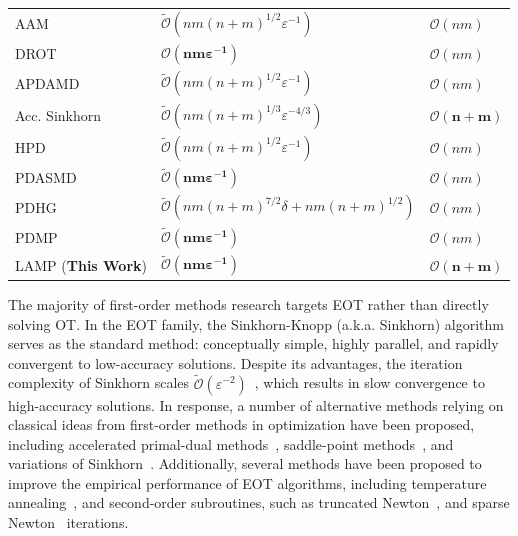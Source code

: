 \documentclass[10pt]{article}
\renewcommand{\O}{\mathcal{O}}
\newcommand{\tO}{\widetilde{\O}}
\theoremstyle{plain}
\theoremstyle{definition}
\theoremstyle{remark}
\begin{document}
\begin{table}[h]
\begin{tabular}{|l|l|l|}
           
         AAM~\cite{guminovCombinationAlternatingMinimization2021} & $\tO(nm(n+m)^{1/2}\varepsilon^{-1})$  & $\mathcal{O}(nm)$ \\
          DROT~\cite{maiFastAccurateSplitting2021a} & $\bm{\O(nm\varepsilon^{-1})}$ & $\mathcal{O}(nm)$\\
         APDAMD~\cite{linEfficiencyEntropicRegularized2022} & $\tO(nm(n+m)^{1/2}\varepsilon^{-1})$ & $\mathcal{O}(nm)$\\
         Acc. Sinkhorn~\cite{linEfficiencyEntropicRegularized2022}  & $\tO(nm(n+m)^{1/3}\varepsilon^{-4/3})$ & $\bm{\mathcal{O}(n+m)}$\\
         HPD~\cite{chambolleAcceleratedBregmanPrimalDual2022} & $\tO(nm(n+m)^{1/2}\varepsilon^{-1})$ & $\mathcal{O}(nm)$\\
         PDASMD~\cite{luoImprovedRateFirst2023} & $\bm{\tO(nm\varepsilon^{-1})}$ & $\mathcal{O}(nm)$\\
         PDHG~\cite{luPDOTPracticalPrimalDual2024} & $\tO(nm(n+m)^{7/2}\delta+ nm(n+m)^{1/2})$ & $\mathcal{O}(nm)$\\PDMP~\cite{liFastComputationOptimal2025} & $\bm{\tO(nm\varepsilon^{-1})}$ & $\mathcal{O}(nm)$\\
         LAMP (\textbf{This Work}) & $\bm{\tO(nm\varepsilon^{-1})}$ & $\bm{\mathcal{O}(n+m)}$\\
         \hline
    \end{tabular}
\end{table}


The majority of first-order methods research targets EOT rather than directly solving OT. In the EOT family, the Sinkhorn-Knopp (a.k.a. Sinkhorn) algorithm~\cite{sinkhornConcerningNonnegativeMatrices1967} serves as the standard method: conceptually simple, highly parallel, and rapidly convergent to low-accuracy solutions. Despite its advantages, the iteration complexity of Sinkhorn scales $\tO(\varepsilon^{-2})$~\cite{dvurechenskyComputationalOptimalTransport2018}, which results in slow convergence to high-accuracy solutions. In response, a number of alternative methods relying on classical ideas from first-order methods in optimization have been proposed, including 
accelerated primal-dual methods~\cite{dvurechenskyComputationalOptimalTransport2018,guminovCombinationAlternatingMinimization2021,linEfficiencyEntropicRegularized2022, luoImprovedRateFirst2023}, 
saddle-point methods~\cite{chambolleAcceleratedBregmanPrimalDual2022}, 
and variations of Sinkhorn~\cite{altschulerNearlinearTimeApproximation2017,linEfficiencyEntropicRegularized2022}. Additionally, several methods have been proposed to improve the empirical performance of EOT algorithms, including temperature annealing~\cite{schmitzerStabilizedSparseScaling2019a,kemertasTruncatedNewtonMethod2024,kemertasEfficientAccurateOptimal2025}, and second-order subroutines, such as truncated Newton~\cite{kemertasTruncatedNewtonMethod2024,kemertasEfficientAccurateOptimal2025}, and sparse Newton~\cite{wu2025pins,pan2026inexact} iterations. 
\end{document}

